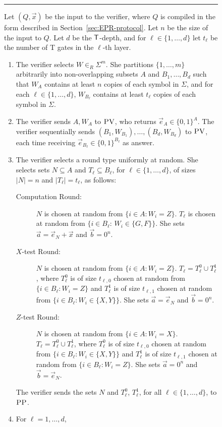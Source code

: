 \begin{figure}[H]
\rule{\textwidth}{0.5pt}
\justify 
Let $(Q,\vec{x})$ be the input to the verifier, where $Q$ is compiled in the form described in Section~\ref{sec:EPR-protocol}. Let $n$ be the size of the input to $Q$. Let $d$ be the $\sf T$-depth, and for $\ell\in\{1,\ldots,d\}$ let $t_\ell$ be the number of {\sf T} gates in the $\ell$-th layer. 
\begin{enumerate}
\item The verifier selects $W \in_R\Sigma^{m}$. She partitions $\{1,\ldots,m\}$ arbitrarily into non-overlapping subsets $A$ and $B_1,\ldots,B_d$ such that $W_A$ contains at least $n$ copies of each symbol in $\Sigma$, and for each $\ell\in\{1,\ldots,d\}$, $W_{B_\ell}$ contains at least $t_\ell$ copies of each symbol in $\Sigma$.
\item The verifier sends $A,W_A$ to $\textsc{PV}$, who returns $\vec{e}_A \in \{0,1\}^A$. The verifier sequentially sends  $(B_1,W_{B_1}),\ldots,(B_d,W_{B_d})$ to $\textsc{PV}$, each time receiving $\vec{e}_{B_\ell}\in \{0,1\}^{B_\ell}$ as answer. 
\item The verifier selects a round type uniformly at random. She selects sets $N \subseteq A$ and  $T_\ell \subseteq B_\ell$, for $\ell\in\{1,\ldots,d\}$, of sizes $|N|=n$ and $|T_\ell|=t_\ell$, as follows:
\begin{description}
\item[Computation Round:] $N$ is chosen at random from 
$\{i\in A: W_i=Z\}$. $T_\ell$ is chosen at random from $\{i\in B_\ell:\,W_i\in \{G,F\}\}$. 
She sets $\vec{a} = \vec{e}_N + \vec{x}$ and $\vec{b} = 0^n$.
\item[$X$-test Round:] $N$ is chosen at random from 
$\{i\in A:W_i=Z\}$. $T_\ell = T_\ell^0 \cup T_\ell^1$, where $T_\ell^0$ is of size $t_{\ell,0}$ chosen at random from $\{i\in B_\ell:W_i=Z\}$ and $T_\ell^1$ is of size $t_{\ell,1}$ chosen at random from $\{i\in B_\ell:W_i\in \{X,Y\}\}$.
She sets $\vec{a} = \vec{e}_N$ and $\vec{b} = 0^n$.
\item[$Z$-test Round:] $N$ is chosen at random from 
$\{i\in A:W_i=X\}$. $T_\ell = T_\ell^0 \cup T_\ell^1$, where $T_\ell^0$ is of size $t_{\ell,0}$ chosen at random from $\{i\in B_\ell:W_i\in\{X,Y\}\}$ and $T_\ell^1$ is of size $t_{\ell,1}$ chosen at random from $\{i\in B_\ell:W_i=Z\}$.
She sets $\vec{a} = 0^n$ and $\vec{b} = \vec{e}_N$.
\end{description}
The verifier sends the sets $N$ and $T_\ell^0$, $T_\ell^1$, for all $\ell\in\{1,\ldots,d\}$, to $\textsc{PP}$.
\item For $\ell=1,\dots,d$, 

\end{enumerate}
\end{figure}
